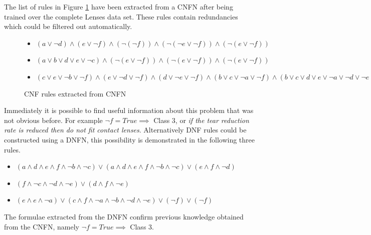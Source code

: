 The list of rules in Figure \ref{fig:lenses-cnfn-rules} have been extracted from a CNFN after being trained over the complete Lenses data set. These rules contain redundancies which could be filtered out automatically.

\begin{figure}[H]
	\begin{itemize}
		\item {} $(a \lor \lnot d) \land (e \lor \lnot f) \land (\lnot ( \lnot f )) \land (\lnot (\lnot e \lor \lnot f)) \land (\lnot(e \lor \lnot f))$
		\item {} $(a \lor b \lor d \lor e \lor \lnot c) \land (\lnot(e \lor \lnot f)) \land (\lnot(e \lor \lnot f)) \land (\lnot(e \lor \lnot f))$
		\item {} $(c \lor e \lor \lnot b \lor \lnot f) \land (e \lor \lnot d \lor \lnot f) \land (d \lor \lnot e \lor \lnot f) \land (b \lor c \lor \lnot a \lor \lnot f) \land (b \lor c \lor d \lor e \lor \lnot a \lor \lnot d \lor \lnot e \lor \lnot f) $
	\end{itemize}
	\caption{CNF rules extracted from CNFN}
	\label{fig:lenses-cnfn-rules}
\end{figure}


Immediately it is possible to find useful information about this problem that was not obvious before. For example $\lnot f = True \implies $ Class 3, or \textit{if the tear reduction rate is reduced then do not fit contact lenses}. Alternatively DNF rules could be constructed using a DNFN, this possibility is demonstrated in the following three rules.

\begin{itemize}
	\item {} $(a \land d \land e \land f \land \lnot b \land \lnot c) \lor (a \land d \land e \land f \land \lnot b \land \lnot c) \lor (e \land f \land \lnot d)$
	\item {} $(f \land \lnot c \land \lnot d \land \lnot e) \lor (d \land f \land \lnot e)$
	\item {} $(e \land e \land \lnot a) \lor (c \land f \land \lnot a \land \lnot b \land \lnot d \land \lnot e) \lor (\lnot f) \lor (\lnot f)$
\end{itemize}

The formulae extracted from the DNFN confirm previous knowledge obtained from the CNFN, namely $\lnot f = True \implies $ Class 3.\\

